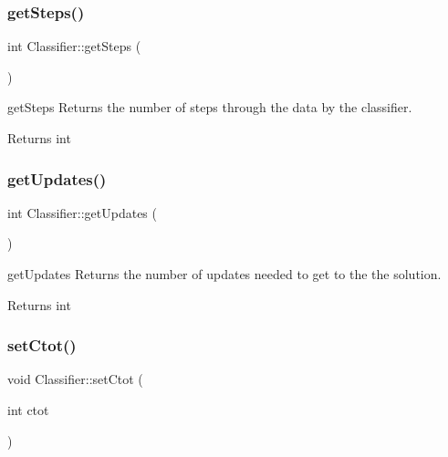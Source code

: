 \subsubsection{\texorpdfstring{get\+Steps()}{getSteps()}}
{\footnotesize\ttfamily int Classifier\+::get\+Steps (\begin{DoxyParamCaption}{ }\end{DoxyParamCaption})\hspace{0.3cm}{\ttfamily [inline]}}



get\+Steps Returns the number of steps through the data by the classifier. 

\begin{DoxyReturn}{Returns}
int 
\end{DoxyReturn}
\mbox{\label{class_classifier_a738c2fbed982db6cad02062edcc037e4}} 
\subsubsection{\texorpdfstring{get\+Updates()}{getUpdates()}}
{\footnotesize\ttfamily int Classifier\+::get\+Updates (\begin{DoxyParamCaption}{ }\end{DoxyParamCaption})\hspace{0.3cm}{\ttfamily [inline]}}



get\+Updates Returns the number of updates needed to get to the the solution. 

\begin{DoxyReturn}{Returns}
int 
\end{DoxyReturn}
\mbox{\label{class_classifier_a3293d7d39c3934503a23b920f84f73e7}} 
\subsubsection{\texorpdfstring{set\+Ctot()}{setCtot()}}
{\footnotesize\ttfamily void Classifier\+::set\+Ctot (\begin{DoxyParamCaption}\item[{int}]{ctot }\end{DoxyParamCaption})}



